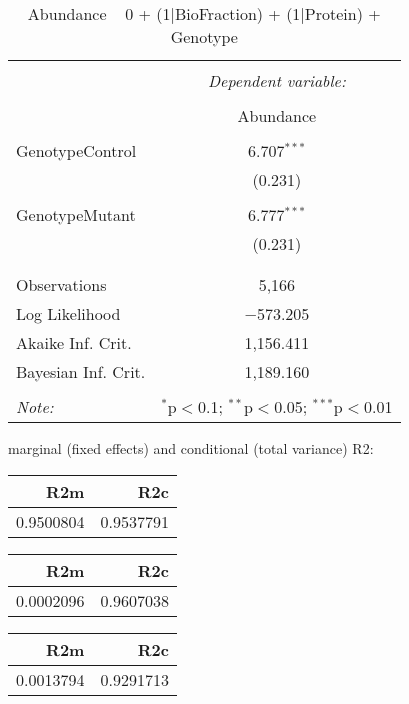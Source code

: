 \documentclass[11pt]{report}
\begin{document}
\begin{table}[!htbp] \centering 
  \caption{Abundance ~ 0 + (1|BioFraction) + (1|Protein) + Genotype} 
  \label{} 
\begin{tabular}{@{\extracolsep{5pt}}lc} 
\\[-1.8ex]\hline 
\hline \\[-1.8ex] 
 & \multicolumn{1}{c}{\textit{Dependent variable:}} \\ 
\cline{2-2} 
\\[-1.8ex] & Abundance \\ 
\hline \\[-1.8ex] 
 GenotypeControl & 6.707$^{***}$ \\ 
  & (0.231) \\ 
  & \\ 
 GenotypeMutant & 6.777$^{***}$ \\ 
  & (0.231) \\ 
  & \\ 
\hline \\[-1.8ex] 
Observations & 5,166 \\ 
Log Likelihood & $-$573.205 \\ 
Akaike Inf. Crit. & 1,156.411 \\ 
Bayesian Inf. Crit. & 1,189.160 \\ 
\hline 
\hline \\[-1.8ex] 
\textit{Note:}  & \multicolumn{1}{r}{$^{*}$p$<$0.1; $^{**}$p$<$0.05; $^{***}$p$<$0.01} \\ 
\end{tabular} 
\end{table} 
marginal (fixed effects) and conditional (total variance) R2:

\begin{tabular}{r|r}
\hline
R2m & R2c\\
\hline
0.9500804 & 0.9537791\\
\hline
\end{tabular}

\begin{tabular}{r|r}
\hline
R2m & R2c\\
\hline
0.0002096 & 0.9607038\\
\hline
\end{tabular}

\begin{tabular}{r|r}
\hline
R2m & R2c\\
\hline
0.0013794 & 0.9291713\\
\hline
\end{tabular}
\end{document}
